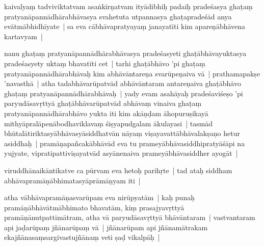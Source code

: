 \documentclass[article,12pt,a4paper]{memoir}%
\newcounter{parCount}
\begin{document}
	  
	  \pstart \leavevmode%
	kaivalyaṃ tadviviktatvam asaṅkīrṇatvam ityādibhiḥ padaiḥ pradeśasya ghaṭaṃ pratyanāpannādhārabhāvasya svahetuta utpannasya ghaṭapradeśād anya evātmābhidhīyate | sa eva cābhāvapratyayaṃ janayatīti kim apareṇābhāvena kartavyam |
	{}
	\pend%
      

	  
	  \pstart \leavevmode%
	\label{thakur75-104.24}nanu ghaṭaṃ pratyanāpannādhārabhāvasya pradeśasyeti ghaṭābhāvayuktasya pradeśasyety uktaṃ bhavatīti cet | tarhi ghaṭābhāvo 'pi ghaṭaṃ pratyanāpannādhārabhāvaḥ kim abhāvāntareṇa svarūpeṇaiva vā | prathamapakṣe 'navasthā | atha tadabhāvarūpatvād abhāvāntaram antareṇaiva ghaṭābhāvo ghaṭaṃ pratyanāpannādhārabhāvaḥ | yady evam asahāyaḥ pradeśaviśeṣo 'pi paryudāsavṛttyā ghaṭābhāvarūpatvād abhāvaṃ vinaiva ghaṭaṃ pratyanāpannādhārabhāvo yukta iti kim akāṇḍam āhopuruṣikayā mithyāpralāpenābodhaviklavaṃ śiṣyapudgalam ākulayasi | tasmād bhūtalātiriktasyābhāvasyāsiddhatvān nāyaṃ viṣayavattābhāvalakṣaṇo hetur asiddhaḥ | pramāṇapañcakābhāvād eva tu prameyābhāvasiddhipratyāśāpi na yujyate, vipratipattiviṣayatvād asyānenaiva prameyābhāvasiddher ayogāt |
	{}
	\pend%
      

	  
	  \pstart \leavevmode%
	\label{thakur75-104.33}viruddhānaikāntikatve ca pūrvam eva hetoḥ parihṛte | tad ataḥ siddham abhāvapramāṇābhimatasyāprāmāṇyam iti |
	{}
	\pend%
      

	  
	  \pstart \leavevmode%
	\label{thakur75-105.1}atha vābhāvapramāṇasvarūpam eva nirūpyatām | kaḥ punaḥ pramāṇābhāvātmābhimato bhavatām, kiṃ prasajyavṛttyā pramāṇānutpattimātram, atha vā paryudāsavṛttyā bhāvāntaram | vastvantaram api jaḍarūpaṃ jñānarūpaṃ vā | jñānarūpam api jñānamātrakam ekajñānasaṃsargivastujñānaṃ veti ṣaḍ vikalpāḥ |
	{}
	\pend%
      
\end{document}
